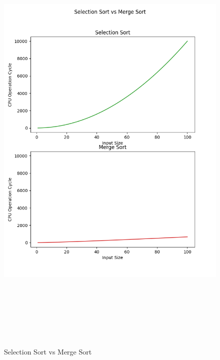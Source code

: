 \documentclass{article}
\begin{document}
\begin{figure}[h]
    \centerline{\includegraphics[width=7in,height=8.5in]{Selection Sort_Merge Sort.png}}
    \caption{Selection Sort vs Merge Sort}
\end{figure}
\end{document}
